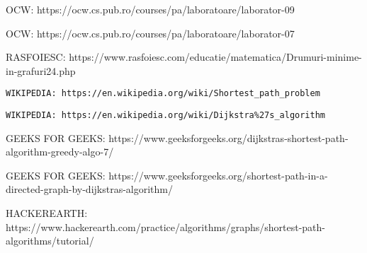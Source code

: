 \documentclass[runningheads]{llncs}
\begin{document}
\begin{thebibliography}{8}
OCW: https://ocw.cs.pub.ro/courses/pa/laboratoare/laborator-09

OCW: https://ocw.cs.pub.ro/courses/pa/laboratoare/laborator-07

RASFOIESC: https://www.rasfoiesc.com/educatie/matematica/Drumuri-minime-in-grafuri24.php

\begin{verbatim}
WIKIPEDIA: https://en.wikipedia.org/wiki/Shortest_path_problem
\end{verbatim}

\begin{verbatim}
WIKIPEDIA: https://en.wikipedia.org/wiki/Dijkstra%27s_algorithm
\end{verbatim}

GEEKS FOR GEEKS: https://www.geeksforgeeks.org/dijkstras-shortest-path-algorithm-greedy-algo-7/

GEEKS FOR GEEKS: https://www.geeksforgeeks.org/shortest-path-in-a-directed-graph-by-dijkstras-algorithm/

HACKEREARTH: https://www.hackerearth.com/practice/algorithms/graphs/shortest-path-algorithms/tutorial/
\end{thebibliography}
%
%
%
%
%
\end{document}
